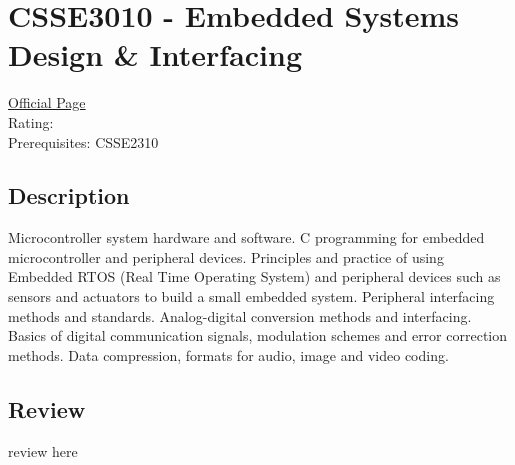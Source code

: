 \hypertarget{CSSE3010}{\section{CSSE3010 - Embedded Systems Design \& Interfacing}}

\large
\textcolor{turbo_purple}{\href{https://my.uq.edu.au/programs-courses/course.html?course_code=CSSE3010}{Official Page}} \\
Rating: \cstar\cstar\cstar\cstar\ostar \\
Prerequisites: CSSE2310

\normalsize
\subsection*{Description}
Microcontroller system hardware and software.
C programming for embedded microcontroller and peripheral devices.
Principles and practice of using Embedded RTOS (Real Time Operating System) and peripheral devices such as sensors and actuators to build a small embedded system.
Peripheral interfacing methods and standards. Analog-digital conversion methods and interfacing. Basics of digital communication signals, modulation schemes and error correction methods.
Data compression, formats for audio, image and video coding.

\subsection*{Review}
review here
